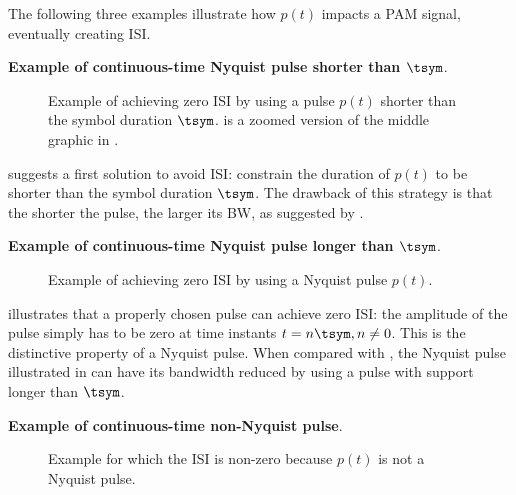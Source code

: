 The following three examples illustrate how $p(t)$ impacts a PAM signal,
eventually creating ISI.%

\bExample \textbf{Example of continuous-time Nyquist pulse shorter than $\tsym$}.
\begin{figure}[!htb]
  \begin{center}
  \end{center}
  \caption{Example of achieving zero ISI by using a pulse $p(t)$ shorter than the symbol duration $\tsym$.  is a zoomed version of the middle graphic in .\label{fig:isiExample1}}  
\end{figure}
 suggests a first solution to avoid ISI: constrain the duration of $p(t)$ to be shorter than the symbol duration $\tsym$. The drawback of this strategy is that the shorter the pulse, the larger its BW, as suggested by .
\eExample

\bExample \textbf{Example of continuous-time Nyquist pulse longer than $\tsym$}.
\begin{figure}[!htb]
  \begin{center}
  \end{center}
  \caption{Example of achieving zero ISI by using a Nyquist pulse $p(t)$.\label{fig:isiExample2}}  
\end{figure}

 illustrates that a properly chosen pulse can achieve zero ISI: the amplitude of the pulse simply has to be zero at time instants $t=n \tsym, n \ne 0$. 
This is the distinctive property of a Nyquist pulse.
When compared with , the Nyquist pulse illustrated in  can have its bandwidth reduced by using a pulse with support longer than $\tsym$.
\eExample

\bExample \textbf{Example of continuous-time non-Nyquist pulse}.
\begin{figure}[!htb]
  \begin{center}
  \end{center}
  \caption{Example for which the ISI is non-zero because $p(t)$ is not a Nyquist pulse.\label{fig:isiExample3}}  
\end{figure}

